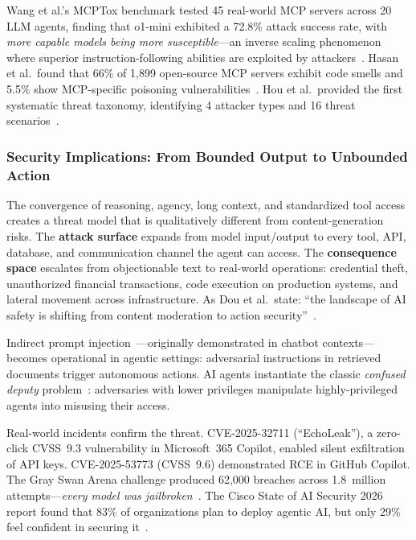 Wang et al.'s MCPTox benchmark tested 45 real-world MCP servers across 20 LLM agents, finding that o1-mini exhibited a 72.8\% attack success rate, with \emph{more capable models being more susceptible}---an inverse scaling phenomenon where superior instruction-following abilities are exploited by attackers~\cite{wang2025mcptox}. Hasan et al.\ found that 66\% of 1,899 open-source MCP servers exhibit code smells and 5.5\% show MCP-specific poisoning vulnerabilities~\cite{hasan2025mcpglance}. Hou et al.\ provided the first systematic threat taxonomy, identifying 4 attacker types and 16 threat scenarios~\cite{hou2025mcplandscape}.


\subsubsection{Security Implications: From Bounded Output to Unbounded Action}
\label{sec:cap-implications}

The convergence of reasoning, agency, long context, and standardized tool access creates a threat model that is qualitatively different from content-generation risks. The \textbf{attack surface} expands from model input/output to every tool, API, database, and communication channel the agent can access. The \textbf{consequence space} escalates from objectionable text to real-world operations: credential theft, unauthorized financial transactions, code execution on production systems, and lateral movement across infrastructure. As Dou et al.\ state: ``the landscape of AI safety is shifting from content moderation to action security''~\cite{dou2026ajar}.

Indirect prompt injection~\cite{greshake2023ipi}---originally demonstrated in chatbot contexts---becomes operational in agentic settings: adversarial instructions in retrieved documents trigger autonomous actions. AI agents instantiate the classic \emph{confused deputy} problem~\cite{hardy1988confused}: adversaries with lower privileges manipulate highly-privileged agents into misusing their access.

Real-world incidents confirm the threat. CVE-2025-32711 (``EchoLeak''), a zero-click CVSS~9.3 vulnerability in Microsoft~365 Copilot, enabled silent exfiltration of API keys. CVE-2025-53773 (CVSS~9.6) demonstrated RCE in GitHub Copilot. The Gray Swan Arena challenge produced 62,000 breaches across 1.8~million attempts---\emph{every model was jailbroken}~\cite{grayswan2025arena}. The Cisco State of AI Security 2026 report found that 83\% of organizations plan to deploy agentic AI, but only 29\% feel confident in securing it~\cite{cisco2026aisecurity}.

